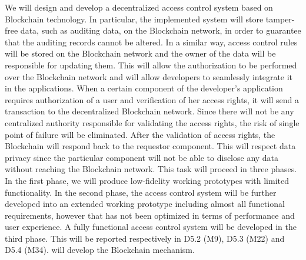 \begin{Workpackage}{\thewpno}
\begin{Task}

\TaskResults{%
\ref{del:auth2},
\ref{del:auth3},
\ref{del:auth4}
}
\TaskHeader{}
We will design and develop a decentralized access control system based on Blockchain technology. In particular, the implemented system will store tamper-free data, such as auditing data, on the Blockchain network, in order to guarantee that the auditing records cannot be altered. In a similar way, access control rules will be stored on the Blockchain network and the owner of the data will be responsible for updating them. This will allow the authorization to be performed over the Blockchain network and will allow developers to seamlessly integrate it in the applications. When a certain component of the developer's application requires authorization of a user and verification of her access rights, it will send a transaction to the decentralized Blockchain network. Since there will not be any centralized authority responsible for validating the access rights, the risk of single point of failure will be eliminated. After the validation of access rights, the Blockchain will respond back to the requestor component. This will respect data privacy since the particular component will not be able to disclose any data without reaching the Blockchain network. This task will proceed in three phases. In the first phase, we will produce low-fidelity working prototypes with limited functionality. In the second phase, the access control system will be further developed into an extended working prototype including almost all functional requirements, however that has not been optimized in terms of performance and user experience. A fully functional access control system will be developed in the third phase. This will be reported respectively in D5.2 (M9), D5.3 (M22) and D5.4 (M34). \COGNIshort{} will develop the Blockchain mechanism.
\end{Task}


\begin{Task}
\TaskResults{%
\ref{del:auth2},
\ref{del:auth3},
\ref{del:auth4}
}
\TaskHeader{}


\end{Task}
\end{Workpackage}
